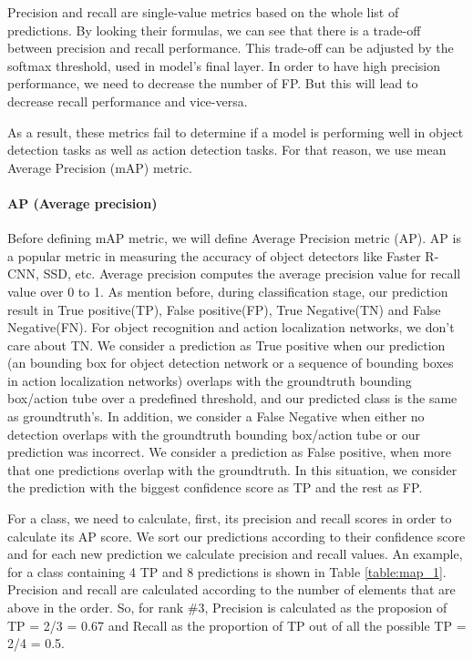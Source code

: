 Precision and recall are single-value metrics based on the whole list of predictions. By looking their formulas, we can see that there is
a trade-off between precision and recall performance. This trade-off can be adjusted by the softmax threshold, used in model's final layer.
In order to have high precision performance, we need to decrease the number of FP. But this will lead to decrease recall performance and
vice-versa. \par
As a result, these metrics fail to determine if a model is performing well in object detection tasks as well as action detection tasks. For
that reason, we use mean Average Precision (mAP) metric.
\paragraph{AP (Average precision)} Before defining mAP metric, we will define Average Precision metric (AP). AP is a popular metric in measuring the accuracy of
object detectors like Faster R-CNN, SSD, etc. Average precision computes the average precision value for recall value over 0 to 1.
As mention before, during classification stage, our prediction result in True positive(TP), False positive(FP), True Negative(TN) and False Negative(FN). For object recognition and action
localization networks, we don't care about TN. We consider a prediction as True positive when our prediction (an bounding box for object detection network or a sequence of bounding boxes in
action localization networks) overlaps with the groundtruth bounding box/action tube over a predefined threshold, and our predicted class is the same as groundtruth's. In addition, we
consider a False Negative when either no detection overlaps with the groundtruth bounding box/action tube or our prediction was incorrect. We consider a prediction as False positive, when more that
one predictions overlap with the groundtruth. In this situation, we consider the prediction with the biggest confidence score as TP and the rest as FP.\par

For a class, we need to calculate, first, its precision and recall scores in order to calculate its AP score. We sort our predictions according to their confidence score and for each new prediction we
calculate precision and recall values. An example, for a class containing 4 TP and 8 predictions  is shown in Table \ref{table:map_1}. Precision and recall
are calculated according to the number of elements that are above in the order. So, for rank \#3, Precision is calculated as the proposion of TP = 2/3 = 0.67
and Recall as the proportion of TP out of all the possible TP = 2/4 = 0.5.

